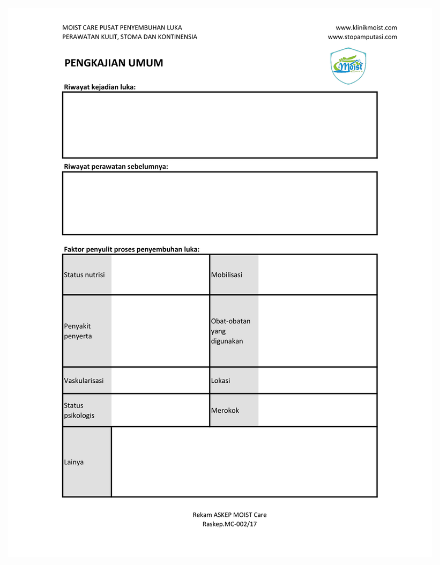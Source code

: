 \begin{figure}[H]
	\centering
	\includegraphics[keepaspectratio, width=14cm]{gambar/Format_Pengkajian-4}
	\label{gambar:Format_Pengkajian_4}
\end{figure}

